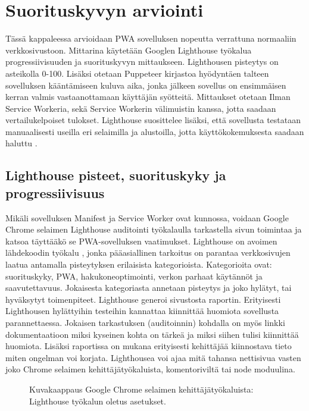 \documentclass{tktltiki}
\begin{document}
\clearpage
\section{Suorituskyvyn arviointi}

Tässä kappaleessa arvioidaan PWA sovelluksen nopeutta verrattuna normaaliin verkkosivustoon. Mittarina käytetään Googlen Lighthouse työkalua progressiivisuuden ja suorituskyvyn mittaukseen. Lighthousen pisteytys on asteikolla 0-100. Lisäksi otetaan Puppeteer kirjastoa hyödyntäen talteen sovelluksen kääntämiseen kuluva aika, jonka jälkeen sovellus on ensimmäisen kerran valmis vastaanottamaan käyttäjän syötteitä. Mittaukset otetaan Ilman Service Workeria, sekä Service Workerin välimuistin kanssa, jotta saadaan vertailukelpoiset tulokset. Lighthouse suosittelee lisäksi, että sovellusta testataan manuaalisesti useilla eri selaimilla ja alustoilla, jotta käyttökokemuksesta saadaan haluttu \cite{von2018progressive}.

\subsection{Lighthouse pisteet, suorituskyky ja progressiivisuus}

Mikäli sovelluksen Manifest ja Service Worker ovat kunnossa, voidaan Google Chrome selaimen Lighthouse auditointi työkalaulla tarkastella sivun toimintaa ja katsoa täyttääkö se PWA-sovelluksen vaatimukset. Lighthouse on avoimen lähdekoodin työkalu \cite{Google2}, jonka pääasiallinen tarkoitus on parantaa verkkosivujen laatua antamalla pisteytyksen erilaisista kategorioista. Kategorioita ovat: suorituskyky, PWA, hakukoneoptimointi, verkon parhaat käytännöt ja saavutettavuus. Jokaisesta kategoriasta annetaan pisteytys ja joko hylätyt, tai hyväksytyt toimenpiteet. Lighthouse generoi sivustosta raportin. Erityisesti Lighthousen hylättyihin testeihin kannattaa kiinnittää huomiota sovellusta parannettaessa. Jokaisen tarkastuksen (auditoinnin) kohdalla on myös linkki dokumentaatioon miksi kyseinen kohta on tärkeä ja miksi siihen tulisi kiinnittää huomiota. Lisäksi raportissa on mukana erityisesti kehittäjää kiinnostava tieto miten ongelman voi korjata. Lighthousea voi ajaa mitä tahansa nettisivua vasten joko Chrome selaimen kehittäjätyökaluista, komentoriviltä tai node moduulina.

\begin{figure}[h]
\begin{center}
\caption{Kuvakaappaus Google Chrome selaimen kehittäjätyökaluista: Lighthouse työkalun oletus asetukset.}
\label{Lighthouse}
\end{center}
\end{figure}
\end{document}
